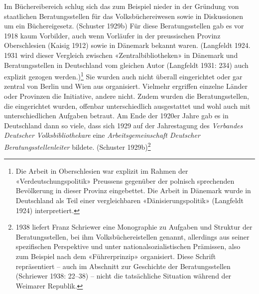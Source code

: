 \documentclass[a4paper,
fontsize=11pt,
oneside,
numbers=noperiodatend,
parskip=half-,
bibliography=totoc,
final
]{scrartcl}
\begin{document}
Im Büchereibereich schlug sich das zum Beispiel nieder in der Gründung
von staatlichen Beratungsstellen für das Volksbüchereiwesen sowie in
Diskussionen um ein Büchereigesetz. (Schuster 1929b) Für diese
Beratungsstellen gab es vor 1918 kaum Vorbilder, auch wenn Vorläufer in
der preussischen Provinz Oberschlesien (Kaisig 1912) sowie in Dänemark
bekannt waren. (Langfeldt 1924. 1931 wird dieser Vergleich zwischen
«Zentralbibliotheken» in Dänemark und Beratungsstellen in Deutschland
vom gleichen Autor (Langfeldt 1931: 234) auch explizit gezogen
werden.)\footnote{Die Arbeit in Oberschlesien war explizit im Rahmen der
  «Verdeutschungspolitik» Preussens gegenüber der polnisch sprechenden
  Bevölkerung in dieser Provinz eingebettet. Die Arbeit in Dänemark
  wurde in Deutschland als Teil einer vergleichbaren
  «Dänisierungspolitik» (Langfeldt 1924) interpretiert.} Sie wurden auch
nicht überall eingerichtet oder gar zentral von Berlin und Wien aus
organisiert. Vielmehr ergriffen einzelne Länder oder Provinzen die
Initiative, andere nicht. Zudem wurden die Beratungsstellen, die
eingerichtet wurden, offenbar unterschiedlich ausgestattet und wohl auch
mit unterschiedlichen Aufgaben betraut. Am Ende der 1920er Jahre gab es
in Deutschland dann so viele, dass sich 1929 auf der Jahrestagung des
\emph{Verbandes Deutscher Volksbibliothekare} eine
\emph{Arbeitsgemeinschaft Deutscher Beratungsstellenleiter} bildete.
(Schuster 1929b)\footnote{1938 liefert Franz Schriewer eine Monographie
  zu Aufgaben und Struktur der Beratungsstellen, bei ihm
  Volksbüchereistellen genannt, allerdings aus seiner spezifischen
  Perspektive und unter nationalsozialistischen Prämissen, also zum
  Beispiel nach dem «Führerprinzip» organisiert. Diese Schrift
  repräsentiert -- auch im Abschnitt zur Geschichte der Beratungsstellen
  (Schriewer 1938: 22--38) -- nicht die tatsächliche Situation während
  der Weimarer Republik.}
\end{document}

